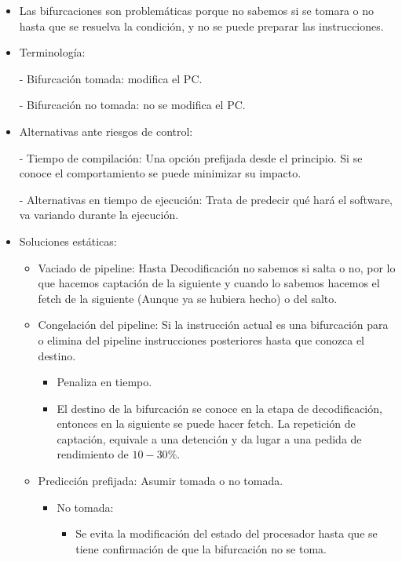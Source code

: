 \documentclass[12pt, twoside, openright]{report} %
\begin{document}
\begin{itemize}
	\item Las bifurcaciones son problemáticas porque no sabemos si se tomara o no hasta que se resuelva la condición, y no se puede preparar las instrucciones.
	\item Terminología:

	      - Bifurcación tomada: modifica el PC.

	      - Bifurcación no tomada: no se modifica el PC.
	\item Alternativas ante riesgos de control:

	      - Tiempo de compilación: Una opción prefijada desde el principio. Si se conoce el comportamiento se puede minimizar su impacto.

	      - Alternativas en tiempo de ejecución: Trata de predecir qué hará el software, va variando durante la ejecución.
	\item Soluciones estáticas:
	      \begin{itemize}
		      \item Vaciado de pipeline: Hasta Decodificación no sabemos si salta o no, por lo que hacemos captación de la siguiente y cuando lo sabemos hacemos el fetch de la siguiente (Aunque ya se hubiera hecho) o del salto.
		      \item Congelación del pipeline: Si la instrucción actual es una bifurcación para o elimina del pipeline instrucciones posteriores hasta que conozca el destino.
		            \begin{itemize}
			            \item Penaliza en tiempo.

			            \item El destino de la bifurcación se conoce en la etapa de decodificación, entonces en la siguiente se puede hacer fetch. La repetición de captación, equivale a una detención y da lugar a una pedida de rendimiento de $10-30\%$.
		            \end{itemize}

		      \item Predicción prefijada: Asumir tomada o no tomada.
		            \begin{itemize}
			            \item No tomada:
			                  \begin{itemize}
				                  \item Se evita la modificación del estado del procesador hasta que se tiene confirmación de que la bifurcación no se toma.


\end{itemize}
\end{itemize}
\end{itemize}
\end{itemize}
\end{document}
